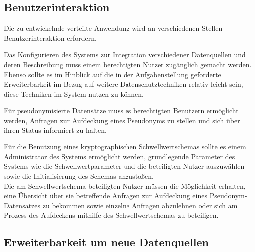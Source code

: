 \subsection{Benutzerinteraktion}

\label{subsec_impl_requirements_userinteraction}




Die zu entwickelnde verteilte Anwendung wird an verschiedenen Stellen Benutzerinteraktion erfordern.

Das Konfigurieren des Systems zur Integration verschiedener Datenquellen und deren Beschreibung muss einem berechtigten Nutzer zugänglich gemacht werden. Ebenso sollte es im Hinblick auf die in der Aufgabenstellung geforderte Erweiterbarkeit im Bezug auf weitere Datenschutztechniken relativ leicht sein, diese Techniken im System nutzen zu können. 

Für pseudonymisierte Datensätze muss es berechtigten Benutzern ermöglicht werden, Anfragen zur Aufdeckung eines Pseudonyms zu stellen und sich über ihren Status informiert zu halten.

Für die Benutzung eines kryptographischen Schwellwertschemas sollte es einem Administrator des Systems ermöglicht werden, grundlegende Parameter des Systems wie die Schwellwertparameter und die beteiligten Nutzer auszuwählen sowie die Initialisierung des Schemas anzustoßen. \\
Die am Schwellwertschema beteiligten Nutzer müssen die Möglichkeit erhalten, eine Übersicht über sie betreffende Anfragen zur Aufdeckung eines Pseudonym-Datensatzes zu bekommen sowie einzelne Anfragen abzulehnen oder sich am Prozess des Aufdeckens mithilfe des Schwellwertschemas zu beteiligen. 

\subsection{Erweiterbarkeit um neue Datenquellen}

\label{subsec_impl_requirements_differentsources}

